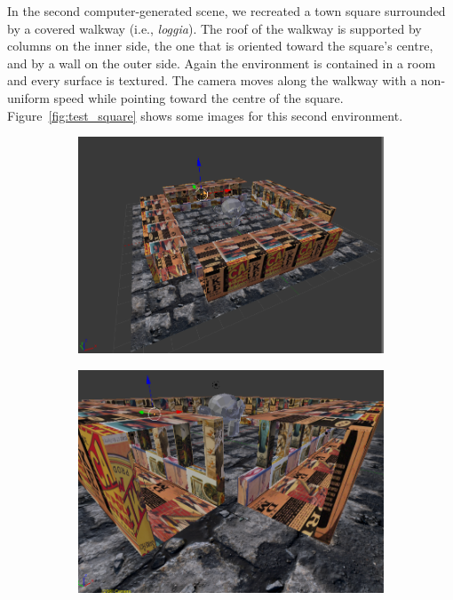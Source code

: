 In the second computer-generated scene, we recreated a town square surrounded by
a covered walkway (i.e., \emph{loggia}). The roof of the walkway is supported by columns on the inner
side, the one that is oriented toward the square's centre, and by a wall on the
outer side.
Again the environment is contained in a room and every surface is textured.
The camera moves along the walkway with a non-uniform speed while pointing toward
the centre of the square. Figure~\ref{fig:test_square} shows some images
for this second environment.
%
\begin{figure}
\centering
	\begin{subfigure}{0.4\textwidth}
		\centering
		\includegraphics[width=\textwidth]{img/square1}
	\end{subfigure}
	\begin{subfigure}{0.4\textwidth}
		\centering
		\includegraphics[width=\textwidth]{img/square2}

\end{subfigure}
\end{figure}
